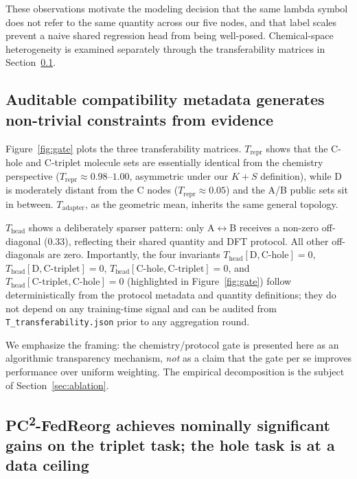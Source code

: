 \documentclass[11pt,a4paper]{article}
\newcommand{\PC}{PC\textsuperscript{2}-FedReorg}
\begin{document}
These observations motivate the modeling decision that the same lambda symbol does not refer to the same quantity across our five nodes, and that label scales prevent a naive shared regression head from being well-posed. Chemical-space heterogeneity is examined separately through the transferability matrices in Section~\ref{sec:audit}.

\subsection{Auditable compatibility metadata generates non-trivial constraints from evidence}\label{sec:audit}

Figure~\ref{fig:gate} plots the three transferability matrices. $T_{\mathrm{repr}}$ shows that the C-hole and C-triplet molecule sets are essentially identical from the chemistry perspective ($T_{\mathrm{repr}} \approx 0.98$--$1.00$, asymmetric under our $K + S$ definition), while D is moderately distant from the C nodes ($T_{\mathrm{repr}} \approx 0.05$) and the A/B public sets sit in between. $T_{\mathrm{adapter}}$, as the geometric mean, inherits the same general topology.

$T_{\mathrm{head}}$ shows a deliberately sparser pattern: only A$\leftrightarrow$B receives a non-zero off-diagonal (0.33), reflecting their shared quantity and DFT protocol. All other off-diagonals are zero. Importantly, the four invariants $T_{\mathrm{head}}[\mathrm{D}, \mathrm{C\text{-}hole}] = 0$, $T_{\mathrm{head}}[\mathrm{D}, \mathrm{C\text{-}triplet}] = 0$, $T_{\mathrm{head}}[\mathrm{C\text{-}hole}, \mathrm{C\text{-}triplet}] = 0$, and $T_{\mathrm{head}}[\mathrm{C\text{-}triplet}, \mathrm{C\text{-}hole}] = 0$ (highlighted in Figure~\ref{fig:gate}) follow deterministically from the protocol metadata and quantity definitions; they do not depend on any training-time signal and can be audited from \texttt{T\_transferability.json} prior to any aggregation round.

We emphasize the framing: the chemistry/protocol gate is presented here as an algorithmic transparency mechanism, \emph{not} as a claim that the gate per se improves performance over uniform weighting. The empirical decomposition is the subject of Section~\ref{sec:ablation}.

\subsection{\PC{} achieves nominally significant gains on the triplet task; the hole task is at a data ceiling}\label{sec:main-perf}
\end{document}
